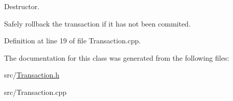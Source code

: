 Destructor. 

Safely rollback the transaction if it has not been commited. 

Definition at line 19 of file Transaction.\-cpp.



The documentation for this class was generated from the following files\-:\begin{DoxyCompactItemize}
\item 
src/\hyperlink{a00034}{Transaction.\-h}\item 
src/Transaction.\-cpp\end{DoxyCompactItemize}
